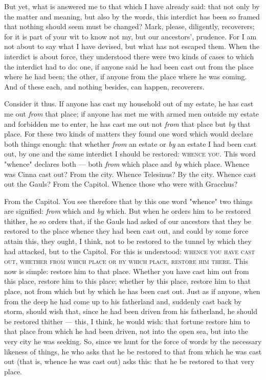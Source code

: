  But yet, what is answered me to that which I have already said: that not only by the matter and meaning, but also by the words, this interdict has been so framed that nothing should seem must be changed? Mark, please, diligently, recoverers; for it is part of your wit to know not my, but our ancestors', prudence. For I am not about to say what I have devised, but what has not escaped them. When the interdict is about force, they understood there were two kinds of cases to which the interdict had to do: one, if anyone said he had been cast out from the place where he had been; the other, if anyone from the place where he was coming. And of these each, and nothing besides, can happen, recoverers.

 Consider it thus. If anyone has cast my household out of my estate, he has cast me out \textit{from} that place; if anyone has met me with armed men outside my estate and forbidden me to enter, he has cast me out not \textit{from} that place but \textit{by} that place. For these two kinds of matters they found one word which would declare both things enough: that whether \textit{from} an estate or \textit{by} an estate I had been cast out, by one and the same interdict I should be restored: \textsc{whence you}. This word "whence" declares both --- both \textit{from} which place and \textit{by} which place. Whence was Cinna cast out? From the city. Whence Telesinus? By the city. Whence cast out the Gauls? From the Capitol. Whence those who were with Gracchus?

 From the Capitol. You see therefore that by this one word "whence" two things are signified: \textit{from} which and \textit{by} which. But when he orders him to be restored thither, he so orders that, if the Gauls had asked of our ancestors that they be restored to the place whence they had been cast out, and could by some force attain this, they ought, I think, not to be restored to the tunnel by which they had attacked, but to the Capitol. For this is understood: \textsc{whence you have cast out, whether from which place or by which place, restore him there}. This now is simple: restore him to that place. Whether you have cast him out from this place, restore him to this place; whether by this place, restore him to that place, not from which but by which he has been cast out. Just as if anyone, when from the deep he had come up to his fatherland and, suddenly cast back by storm, should wish that, since he had been driven from his fatherland, he should be restored thither --- this, I think, he would wish: that fortune restore him to that place from which he had been driven, not into the open sea, but into the very city he was seeking. So, since we hunt for the force of words by the necessary likeness of things, he who asks that he be restored to that from which he was cast out (that is, whence he was cast out) asks this: that he be restored to that very place.

